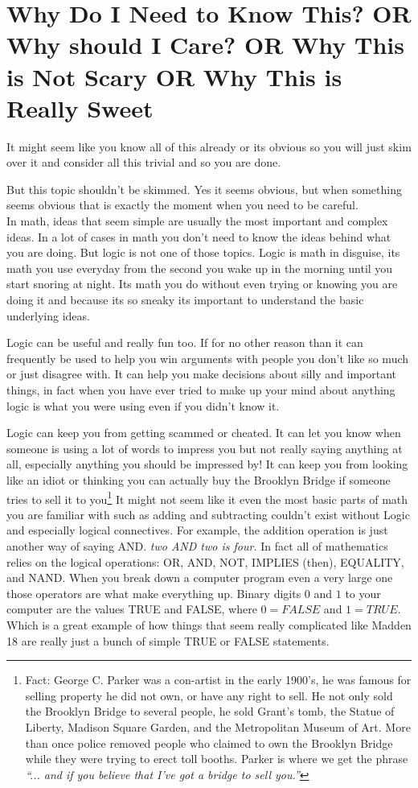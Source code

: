 \documentclass{article}
\begin{document}
\section*{Why Do I Need to Know This? OR Why should I Care? OR Why This is Not Scary OR Why This is Really Sweet}

It might seem like you know all of this already or its obvious so you will just skim over it and consider all this trivial and so you are done. 

But this topic shouldn't be skimmed. Yes it seems obvious, but when something seems obvious that is exactly the moment when you need to be careful. \\

In math, ideas that seem simple are usually the most important and complex ideas. In a lot of cases in math you don't need to know the ideas behind what you are doing. But logic is not one of those topics. Logic is math in disguise, its math you use everyday from the second you wake up in the morning until you start snoring at night. Its math you do without even trying or knowing you are doing it and because its so sneaky its important to understand the basic underlying ideas. 

Logic can be useful and really fun too. If for no other reason than it can frequently be used to help you win arguments with people you don't like so much or just disagree with. It can help you make decisions about silly and important things, in fact when you have ever tried to make up your mind about anything logic is what you were using even if you didn't know it. 

Logic can keep you from getting scammed or cheated. It can let you know when someone is using a lot of words to impress you but not really saying anything at all, especially anything you should be impressed by! It can keep you from looking like an idiot or thinking you can actually buy the Brooklyn Bridge if someone tries to sell it to you\footnote{Fact: George C. Parker was a con-artist in the early 1900's, he was famous for selling property he did not own, or have any right to sell. He not only sold the Brooklyn Bridge to several people, he sold Grant's tomb, the Statue of Liberty, Madison Square Garden, and the Metropolitan Museum of Art. More than once police removed people who claimed to own the Brooklyn Bridge while they were trying to erect toll booths. Parker is where we get the phrase \textit{``... and if you believe that I've got a bridge to sell you.''}} It might not seem like it even the most basic parts of math you are familiar with such as adding and subtracting couldn't exist without Logic and especially logical connectives. For example, the addition operation is just another way of saying AND. \textit{two AND two is four.} In fact all of mathematics relies on the logical operations: OR, AND, NOT, IMPLIES (then), EQUALITY, and NAND. When you break down a computer program even a very large one those operators are what make everything up. Binary digits $0$ and $1$ to your computer are the values TRUE and FALSE, where $0 = FALSE$ and $1 = TRUE$. Which is a great example of how things that seem really complicated like Madden 18 are really just a bunch of simple TRUE or FALSE statements. 
 


\end{document}
